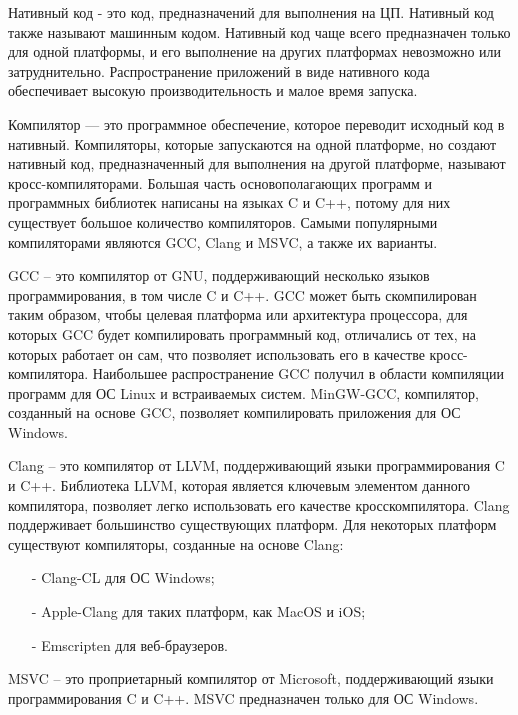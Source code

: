 Нативный код - это код, предназначений для выполнения на ЦП.
Нативный код также называют машинным кодом.
Нативный код чаще всего предназначен только для одной платформы, и его выполнение на других платформах невозможно или затруднительно.
Распространение приложений в виде нативного кода обеспечивает высокую производительность и малое время запуска.

Компилятор — это программное обеспечение, которое переводит исходный код в нативный.
Компиляторы, которые запускаются на одной платформе, но создают нативный код, предназначенный для выполнения на другой платформе, называют кросс-компиляторами.
Большая часть основополагающих программ и программных библиотек написаны на языках C и C++, потому для них существует большое количество компиляторов.
Самыми популярными компиляторами являются GCC, Clang и MSVC, а также их варианты.

GCC -- это компилятор от GNU, поддерживающий несколько языков программирования, в том числе C и C++. 
GCC может быть скомпилирован таким образом, чтобы целевая платформа или архитектура процессора, для которых GCC будет компилировать программный код, отличались от тех, на которых работает он сам, что позволяет использовать его в качестве кросс-компилятора.
Наибольшее распространение GCC получил в области компиляции программ для ОС Linux и встраиваемых систем.
MinGW-GCC, компилятор, созданный на основе GCC, позволяет компилировать приложения для ОС Windows.

Clang -- это компилятор от LLVM, поддерживающий языки программирования C и C++.
Библиотека LLVM, которая является ключевым элементом данного компилятора, позволяет легко использовать его качестве кросскомпилятора. 
Clang поддерживает большинство существующих платформ. 
Для некоторых платформ существуют компиляторы, созданные на основе Clang:
\begin{itemize}
    \item[-] Clang-CL для ОС Windows;
    \item[-] Apple-Clang для таких платформ, как MacOS и iOS;
    \item[-] Emscripten для веб-браузеров.
\end{itemize}

MSVC -- это проприетарный компилятор от Microsoft, поддерживающий языки программирования C и C++. 
MSVC предназначен только для ОС Windows. 


